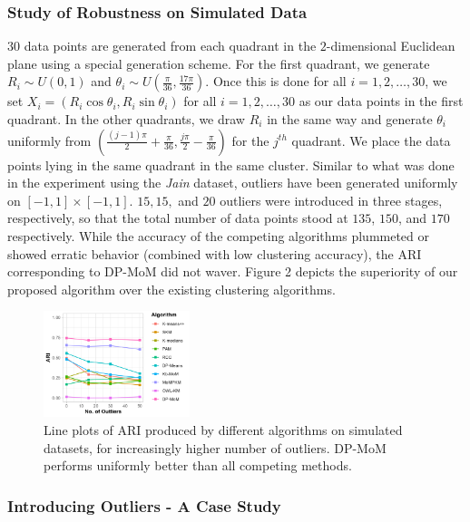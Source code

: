 \documentclass[12pt]{article}
\begin{document}
\subsubsection{Study of Robustness on Simulated Data} $30$ data points are generated from each quadrant in the $2$-dimensional Euclidean plane using a special generation scheme. For the first quadrant, we generate $R_i \sim U(0, 1)$ and $\theta_i \sim U\left(\frac{\pi}{36}, \frac{17\pi}{36}\right)$. Once this is done for all $i=1,2,\ldots,30$, we set $X_i = (R_i\cos\theta_i, R_i\sin \theta_i)$ for all $i=1,2,\ldots,30$ as our data points in the first quadrant. In the other quadrants, we draw $R_i$ in the same way and generate $\theta_i$ uniformly from $\left(\frac{(j - 1)\pi}{2} + \frac{\pi}{36}, \frac{j\pi}{2} - \frac{\pi}{36}\right)$ for the $j^{th}$ quadrant. We place the data points lying in the same quadrant in the same cluster. Similar to what was done in the experiment using the \textit{Jain} dataset, outliers have been generated uniformly on $[-1, 1] \times [-1, 1]$. $15, 15,$ and $20$ outliers were introduced in three stages, respectively, so that the total number of data points stood at $135$, $150$, and $170$ respectively. While the accuracy of the competing algorithms plummeted or showed erratic behavior (combined with low clustering accuracy), the ARI corresponding to DP-MoM did not waver. Figure 2 depicts the superiority of our proposed algorithm over the existing clustering algorithms.

\begin{figure}[!htb]
    \centering
    \includegraphics[width=0.38\textwidth]{Diagrams/plot-ari-sim-light-0.6.png}
    \caption{Line plots of ARI produced by different algorithms on simulated datasets, for increasingly higher number of outliers. DP-MoM performs uniformly better than all competing methods.}
    \label{fig:plot-sim-ari}
\end{figure}

\subsubsection{Introducing Outliers - A Case Study}
\end{document}
